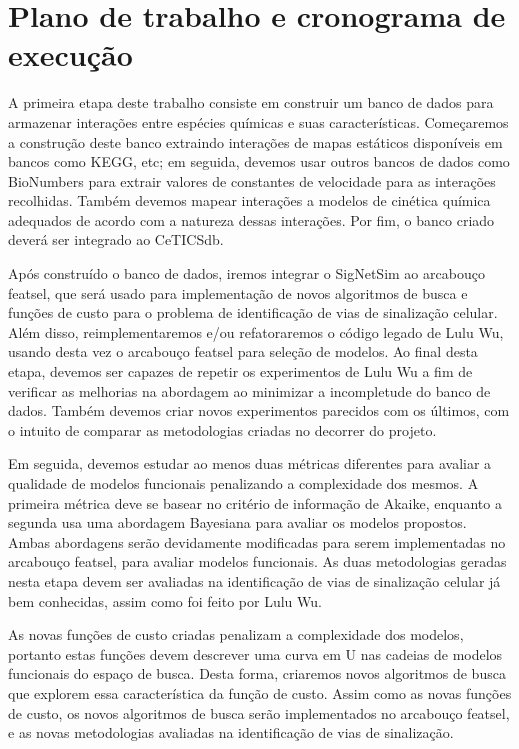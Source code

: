 \documentclass[12pt]{article}
\begin{document}

\section{Plano de trabalho e cronograma de execução}

A primeira etapa deste trabalho consiste em construir um banco de dados
para armazenar interações entre espécies químicas e suas 
características. Começaremos a construção deste banco extraindo
interações de mapas estáticos disponíveis em bancos como KEGG, etc; em
seguida, devemos usar outros bancos de dados como BioNumbers para 
extrair valores de constantes de velocidade para as interações 
recolhidas. Também devemos mapear interações a modelos de cinética 
química adequados de acordo com a natureza dessas interações. Por fim,
o banco criado deverá ser integrado ao CeTICSdb.

Após construído o banco de dados, iremos integrar o SigNetSim ao 
arcabouço featsel, que será usado para implementação de novos algoritmos
de busca e funções de custo para o problema de identificação de vias 
de sinalização celular. Além disso, reimplementaremos e/ou refatoraremos 
o código legado de Lulu Wu, usando desta vez o arcabouço featsel para 
seleção de modelos. Ao final desta etapa, devemos ser capazes
de repetir os experimentos de Lulu Wu a fim de verificar as melhorias na
abordagem ao minimizar a incompletude do banco de dados. Também devemos
criar novos experimentos parecidos com os últimos, com o intuito de 
comparar as metodologias criadas no decorrer do projeto.

Em seguida, devemos estudar ao menos duas métricas diferentes para 
avaliar a qualidade de modelos funcionais penalizando a complexidade 
dos mesmos. A primeira métrica deve se basear no critério de informação 
de Akaike, enquanto a segunda usa uma abordagem Bayesiana para avaliar 
os modelos propostos. Ambas abordagens serão devidamente modificadas 
para serem implementadas no arcabouço featsel, para avaliar modelos 
funcionais. As duas metodologias geradas nesta etapa devem ser 
avaliadas na identificação de vias de sinalização celular já bem 
conhecidas, assim como foi feito por Lulu Wu.

As novas funções de custo criadas penalizam a complexidade dos modelos, 
portanto estas funções devem descrever uma curva em U nas cadeias de 
modelos funcionais do espaço de busca. Desta forma, criaremos novos
algoritmos de busca que explorem essa característica da função de custo.
Assim como as novas funções de custo, os novos algoritmos de busca serão
implementados no arcabouço featsel, e as novas metodologias avaliadas
na identificação de vias de sinalização.
\end{document}

